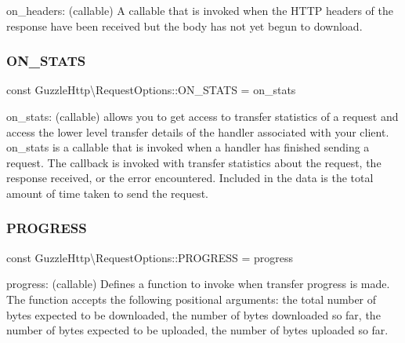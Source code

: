 on\+\_\+headers\+: (callable) A callable that is invoked when the H\+T\+TP headers of the response have been received but the body has not yet begun to download. \mbox{\label{classGuzzleHttp_1_1RequestOptions_a1e6b04bb69c562076265d624a43a01e1}} 
\subsubsection{\texorpdfstring{O\+N\+\_\+\+S\+T\+A\+TS}{ON\_STATS}}
{\footnotesize\ttfamily const Guzzle\+Http\textbackslash{}\+Request\+Options\+::\+O\+N\+\_\+\+S\+T\+A\+TS = \textquotesingle{}on\+\_\+stats\textquotesingle{}}

on\+\_\+stats\+: (callable) allows you to get access to transfer statistics of a request and access the lower level transfer details of the handler associated with your client. {\ttfamily on\+\_\+stats} is a callable that is invoked when a handler has finished sending a request. The callback is invoked with transfer statistics about the request, the response received, or the error encountered. Included in the data is the total amount of time taken to send the request. \mbox{\label{classGuzzleHttp_1_1RequestOptions_a16c0d39481c4042fbe0461b4ce75288d}} 
\subsubsection{\texorpdfstring{P\+R\+O\+G\+R\+E\+SS}{PROGRESS}}
{\footnotesize\ttfamily const Guzzle\+Http\textbackslash{}\+Request\+Options\+::\+P\+R\+O\+G\+R\+E\+SS = \textquotesingle{}progress\textquotesingle{}}

progress\+: (callable) Defines a function to invoke when transfer progress is made. The function accepts the following positional arguments\+: the total number of bytes expected to be downloaded, the number of bytes downloaded so far, the number of bytes expected to be uploaded, the number of bytes uploaded so far. \mbox{\label{classGuzzleHttp_1_1RequestOptions_abf7e4c107ddcea50f32f39544c68f08a}} 
